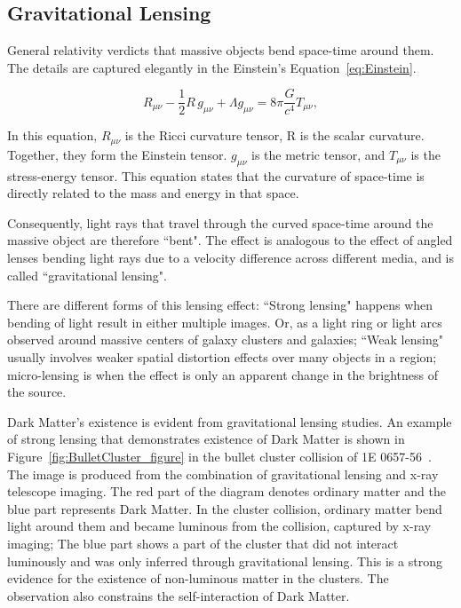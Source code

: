 \subsection{Gravitational Lensing}
General relativity verdicts that massive objects bend space-time around them. The details are captured elegantly in the Einstein's Equation~\ref{eq:Einstein}. 

\begin{equation}
    R_{\mu \nu} - {\frac{1}{2}}R \, g_{\mu \nu} + \Lambda g_{\mu \nu}= {8 \pi \frac{G}{c^4}} T_{\mu \nu}, 
    \label{eq:Einstein}
\end{equation}

In this equation, $R_{\mu \nu}$ is the Ricci curvature tensor, R is the scalar curvature. Together, they form the Einstein tensor. $g_{\mu \nu}$ is the metric tensor, and $T_{\mu \nu}$ is the stress-energy tensor. This equation states that the curvature of space-time is directly related to the mass and energy in that space. 	
	
	Consequently, light rays that travel through the curved space-time around the massive object are therefore ``bent". The effect is analogous to the effect of angled lenses bending light rays due to a velocity difference across different media, and is called ``gravitational lensing". 

    There are different forms of this lensing effect: ``Strong lensing" happens when bending of light result in either multiple images. Or, as a light ring or light arcs observed around massive centers of galaxy clusters and galaxies; ``Weak lensing" usually involves weaker spatial distortion effects over many objects in a region; micro-lensing is when the effect is only an apparent change in the brightness of the source.

    Dark Matter's existence is evident from gravitational lensing studies. An example of strong lensing that demonstrates existence of Dark Matter is shown in Figure~\ref{fig:BulletCluster_figure} in the bullet cluster collision of 1E 0657-56~\cite{BulletCluster}. The image is produced from the combination of gravitational lensing and x-ray telescope imaging. The red part of the diagram denotes ordinary matter and the blue part represents Dark Matter. In the cluster collision, ordinary matter
    bend light around them and became luminous from the collision, captured by x-ray imaging; The blue part shows a part of the cluster that did not interact luminously and was only inferred through gravitational lensing. This is a strong evidence for the existence of non-luminous matter in the clusters. The observation also constrains the self-interaction of Dark Matter.

